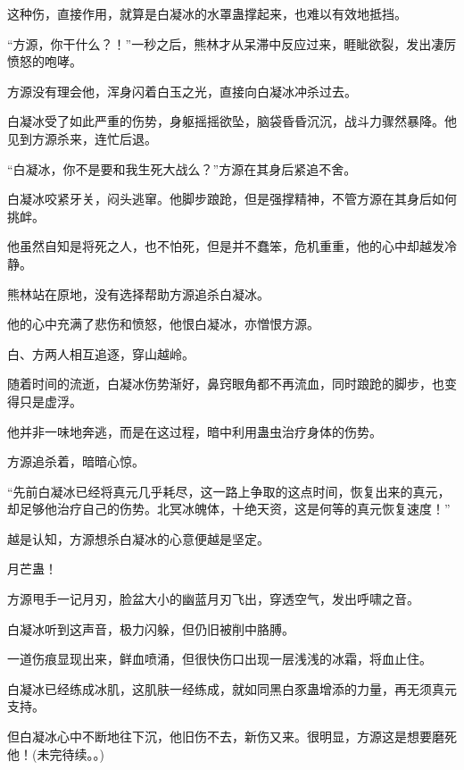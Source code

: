 \begin{this_body}
这种伤，直接作用，就算是白凝冰的水罩蛊撑起来，也难以有效地抵挡。

“方源，你干什么？！”一秒之后，熊林才从呆滞中反应过来，睚眦欲裂，发出凄厉愤怒的咆哮。

方源没有理会他，浑身闪着白玉之光，直接向白凝冰冲杀过去。

白凝冰受了如此严重的伤势，身躯摇摇欲坠，脑袋昏昏沉沉，战斗力骤然暴降。他见到方源杀来，连忙后退。

“白凝冰，你不是要和我生死大战么？”方源在其身后紧追不舍。

白凝冰咬紧牙关，闷头逃窜。他脚步踉跄，但是强撑精神，不管方源在其身后如何挑衅。

他虽然自知是将死之人，也不怕死，但是并不蠢笨，危机重重，他的心中却越发冷静。

熊林站在原地，没有选择帮助方源追杀白凝冰。

他的心中充满了悲伤和愤怒，他恨白凝冰，亦憎恨方源。

白、方两人相互追逐，穿山越岭。

随着时间的流逝，白凝冰伤势渐好，鼻窍眼角都不再流血，同时踉跄的脚步，也变得只是虚浮。

他并非一味地奔逃，而是在这过程，暗中利用蛊虫治疗身体的伤势。

方源追杀着，暗暗心惊。

“先前白凝冰已经将真元几乎耗尽，这一路上争取的这点时间，恢复出来的真元，却足够他治疗自己的伤势。北冥冰魄体，十绝天资，这是何等的真元恢复速度！”

越是认知，方源想杀白凝冰的心意便越是坚定。

月芒蛊！

方源甩手一记月刃，脸盆大小的幽蓝月刃飞出，穿透空气，发出呼啸之音。

白凝冰听到这声音，极力闪躲，但仍旧被削中胳膊。

一道伤痕显现出来，鲜血喷涌，但很快伤口出现一层浅浅的冰霜，将血止住。

白凝冰已经练成冰肌，这肌肤一经练成，就如同黑白豕蛊增添的力量，再无须真元支持。

但白凝冰心中不断地往下沉，他旧伤不去，新伤又来。很明显，方源这是想要磨死他！(未完待续。。)

\end{this_body}

